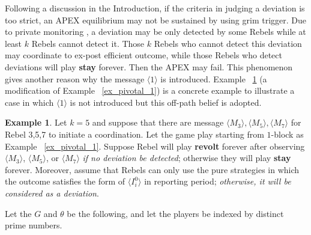\documentclass[12pt,letterpaper]{article}
\newtheorem*{main result}{Main Result}
\theoremstyle{definition}
\newtheorem{example}{Example}[section]
\theoremstyle{remark}
\theoremstyle{claim}
\begin{document}
Following a discussion in the Introduction, if the criteria in judging a deviation is too strict, an APEX equilibrium may not be sustained by using grim trigger. Due to private monitoring , a deviation may be only detected by some Rebels while at least $k$ Rebels cannot detect it. Those $k$ Rebels who cannot detect this deviation may coordinate to ex-post efficient outcome, while those Rebels who detect deviations will play \textbf{stay} forever. Then the APEX may fail. This phenomenon gives another reason why the message $\langle 1 \rangle$ is introduced. Example ~\ref{ex_deviation} (a modification of Example ~\ref{ex_pivotal_1}) is a concrete example to illustrate a case in which $\langle 1 \rangle$ is not introduced but this off-path belief is adopted. 

\begin{example}\label{ex_deviation}
Let $k=5$ and suppose that there are message $\langle M_3 \rangle,\langle M_5 \rangle, \langle M_7 \rangle$ for Rebel 3,5,7 to initiate a coordination. Let the game play starting from $1$-block as Example ~\ref{ex_pivotal_1}. Suppose Rebel will play \textbf{revolt} forever after observing $\langle M_3 \rangle$, $\langle M_5 \rangle$, or $\langle M_7 \rangle$ \textit{if no deviation be detected}; otherwise they will play \textbf{stay} forever. Moreover, assume that Rebels can only use the pure strategies in which the outcome satisfies the form of $\langle I^0_i \rangle$ in reporting period; \textit{otherwise, it  will be considered as a deviation}. 

Let the $G$ and $\theta$ be the following, and let the players be indexed by distinct prime numbers.

\begin{center}


\end{center}




\end{example}
\end{document}

